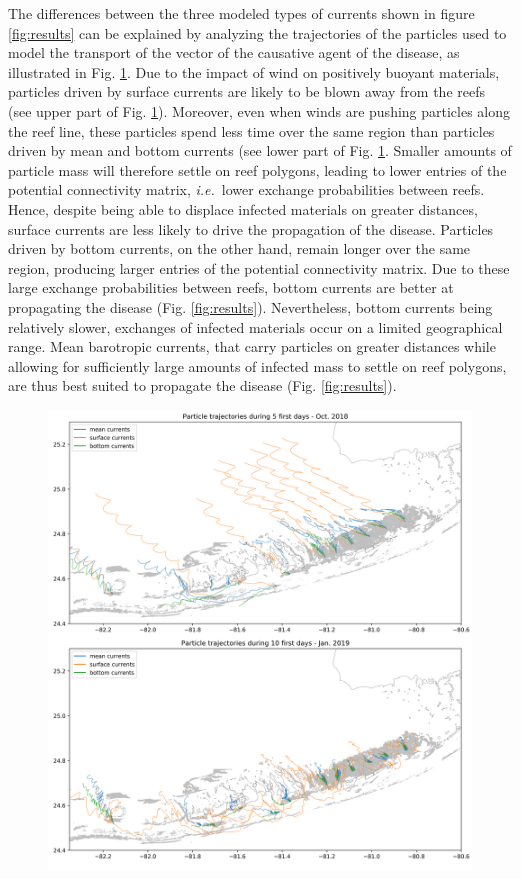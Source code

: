 \documentclass[utf8]{frontiersSCNS}
\newcommand{\ie}{{\it i.e.}\ }
\begin{document}
The differences between the three modeled types of currents shown in figure \ref{fig:results} can be explained by analyzing the trajectories of the particles used to model the transport of the vector of the causative agent of the disease, as illustrated in Fig. \ref{fig:traj}. Due to the impact of wind on positively buoyant materials, particles driven by surface currents are likely to be blown away from the reefs (see upper part of Fig. \ref{fig:traj}). Moreover, even when winds are pushing particles along the reef line, these particles spend less time over the same region than particles driven by mean and bottom currents (see lower part of Fig. \ref{fig:traj}. Smaller amounts of particle mass will therefore settle on reef polygons, leading to lower entries of the potential connectivity matrix, \ie lower exchange probabilities between reefs. Hence, despite being able to displace infected materials on greater distances, surface currents are less likely to drive the propagation of the disease. Particles driven by bottom currents, on the other hand, remain longer over the same region, producing larger entries of the potential connectivity matrix. Due to these large exchange probabilities between reefs, bottom currents are better at propagating the disease (Fig. \ref{fig:results}). Nevertheless, bottom currents being relatively slower, exchanges of infected materials occur on a limited geographical range. Mean barotropic currents, that carry particles on greater distances while allowing for sufficiently large amounts of infected mass to settle on reef polygons, are thus best suited to propagate the disease (Fig. \ref{fig:results}). 

\begin{figure}
    \centering
    \includegraphics[width=.9\textwidth]{figures/traj.png}
    \caption{}
    \label{fig:traj}
\end{figure}
\end{document}
